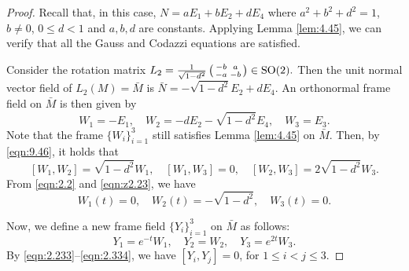 \documentclass[reqno]{amsart}%
\theoremstyle{definition}
\numberwithin{equation}{section}
\begin{document}
	\begin{proof}
		Recall that, in this case, $N=aE_1+bE_2+dE_4$ where $a^2+b^2+d^2=1$,
		$b\neq0$, $0\leq d<1$ and $a,b,d$ are constants.
		Applying Lemma \ref{lem:4.45},
		we can verify that all the Gauss and Codazzi equations are satisfied.
		
		Consider the rotation matrix $L_2= \tfrac{1}{\sqrt{1-d^2}}\left(
		\begin{smallmatrix}
			-b & a \\
			-a & -b \\
		\end{smallmatrix}
		\right)\in {\rm SO(2)}.$
		Then the unit normal vector field of $L_2(M)=\bar{M}$ is
		$\bar{N}=-\sqrt{1-d^2}E_2+dE_4$.
		An orthonormal frame field on $\bar{M}$ is then given by
		\begin{equation}\label{eqn:z2.23}
			W_1=-E_1, \quad W_2=-dE_2-\sqrt{1-d^2}E_4, \quad W_3=E_3.
		\end{equation}
		Note that the frame $\{W_i\}_{i=1}^3$ still satisfies Lemma \ref{lem:4.45} on $\bar{M}$.
		Then, by \eqref{eqn:9.46}, it holds that
		\begin{equation}\label{eqn:2.233}
			[W_1,W_2]=\sqrt{1-d^2}W_1, \quad [W_1,W_3]=0, \quad [W_2,W_3]=2\sqrt{1-d^2}W_3.
		\end{equation}
		From \eqref{eqn:2.2} and \eqref{eqn:z2.23}, we have
		\begin{equation}\label{eqn:x2.23}
			W_1(t)=0, \quad W_2(t)=-\sqrt{1-d^2}, \quad W_3(t)=0.
		\end{equation}
		
		Now, we define a new frame field $\{Y_i\}_{i=1}^3$ on $\bar M$ as follows:
		\begin{equation}\label{eqn:2.334}
			Y_1=e^{-t}W_1, \quad Y_2=W_2, \quad Y_3=e^{2t}W_3.
		\end{equation}
		By \eqref{eqn:2.233}--\eqref{eqn:2.334},
		we have $[Y_i,Y_j]=0$, for $1\leq i<j\leq3$.
		

\end{proof}
\end{document}
